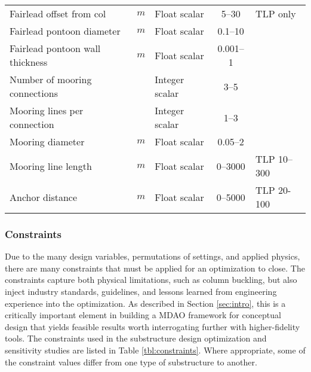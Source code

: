 \begin{table}[htbp]
\begin{center}
{\begin{tabular}{ l c l c l }
    Fairlead offset from col & \unit{$m$} & Float scalar & 5--30 & TLP only\\
    Fairlead pontoon diameter & \unit{$m$} & Float scalar & 0.1--10 &\\
    Fairlead pontoon wall thickness & \unit{$m$} & Float scalar &0.001--1 &\\
    Number of mooring connections && Integer scalar &3--5 &\\
    Mooring lines per connection && Integer scalar &1--3 &\\
    Mooring diameter & \unit{$m$} & Float scalar &0.05--2 &\\
    Mooring line length & \unit{$m$} & Float scalar &0--3000 &TLP 10--300\\
    Anchor distance & \unit{$m$} & Float scalar &0--5000 & TLP 20-100\\
  \hline \end{tabular}
}
\end{center} \end{table}


\subsubsection{Constraints}
Due to the many design variables, permutations of settings, and applied
physics, there are many constraints that must be applied for an
optimization to close.  The constraints capture both physical
limitations, such as column buckling, but also inject industry
standards, guidelines, and lessons learned from engineering experience
into the optimization.  As described in Section \ref{sec:intro}, this is
a critically important element in building a MDAO framework for
conceptual design that yields feasible results worth interrogating
further with higher-fidelity tools.  The constraints used in the
substructure design optimization and sensitivity studies are listed in
Table \ref{tbl:constraints}.  Where appropriate, some of the constraint
values differ from one type of substructure to another.

